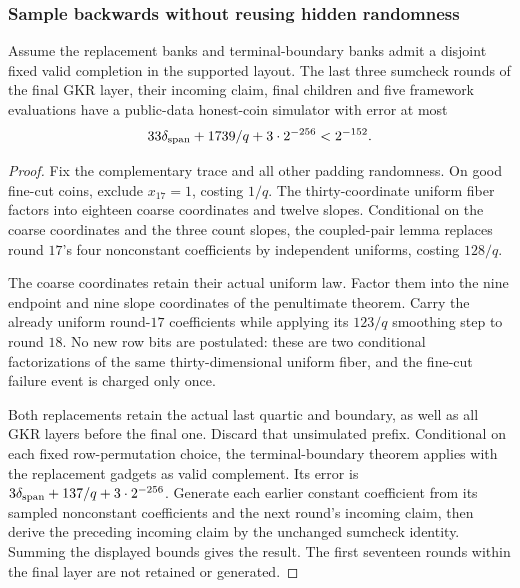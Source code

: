 \subsubsection{Sample backwards without reusing hidden randomness}

\begin{theorem}
Assume the replacement banks and terminal-boundary banks admit a disjoint fixed valid completion in the supported layout. The last three sumcheck rounds of the final GKR layer, their incoming claim, final children and five framework evaluations have a public-data honest-coin simulator with error at most
\[
 33\delta_{\rm span}+1739/q+3\cdot2^{-256}<2^{-152}.
\]
\end{theorem}
\begin{proof}
Fix the complementary trace and all other padding randomness. On good fine-cut coins, exclude $x_{17}=1$, costing $1/q$. The thirty-coordinate uniform fiber factors into eighteen coarse coordinates and twelve slopes. Conditional on the coarse coordinates and the three count slopes, the coupled-pair lemma replaces round $17$'s four nonconstant coefficients by independent uniforms, costing $128/q$.

The coarse coordinates retain their actual uniform law. Factor them into the nine endpoint and nine slope coordinates of the penultimate theorem. Carry the already uniform round-$17$ coefficients while applying its $123/q$ smoothing step to round $18$. No new row bits are postulated: these are two conditional factorizations of the same thirty-dimensional uniform fiber, and the fine-cut failure event is charged only once.

Both replacements retain the actual last quartic and boundary, as well as all GKR layers before the final one. Discard that unsimulated prefix. Conditional on each fixed row-permutation choice, the terminal-boundary theorem applies with the replacement gadgets as valid complement. Its error is $3\delta_{\rm span}+137/q+3\cdot2^{-256}$. Generate each earlier constant coefficient from its sampled nonconstant coefficients and the next round's incoming claim, then derive the preceding incoming claim by the unchanged sumcheck identity. Summing the displayed bounds gives the result. The first seventeen rounds within the final layer are not retained or generated.
\end{proof}

